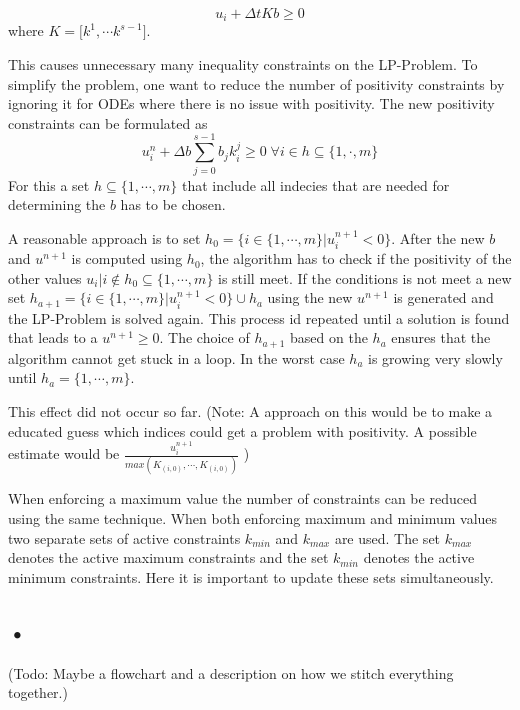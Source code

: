 \documentclass{article}
\begin{document}
\begin{equation}
u_i + \Delta t K  b \geq 0     
\end{equation}
where $K = \big[k^1 , \cdots k^{s-1}\big]$.

This causes unnecessary many inequality constraints on the LP-Problem. To simplify the problem, one want to reduce the number of positivity constraints by ignoring it for ODEs where there is no issue with positivity.
The new positivity constraints can be formulated as
\begin{equation}
u_i^n + \Delta b \sum_{j=0}^{s-1} b_j k_i^j  \geq 0   \;   \forall {i \in h \subseteq \{1,\cdot,m \}} 
\end{equation}
For this a set $h \subseteq \{1,\cdots,m \}$ that include all indecies that are needed for determining the $b$ has to be chosen.

A reasonable approach is to set $h_0 = \{ i \in \{1,\cdots,m \} |  u_i^{n+1}  < 0 \}$. 
After the new $b$ and $u^{n+1}$ is computed using $h_0$, the algorithm has to check if the positivity of the other values $u_i | i \notin h_0 \subseteq \{1,\cdots,m \}$ is still meet. 
If the conditions is not meet a new set $h_{a+1} = \{ i \in \{1,\cdots,m \}|  u_i^{n+1}  < 0 \} \cup h_{a}$ using the new $u^{n+1}$ is generated and the LP-Problem is solved again. This process id repeated until a solution is found that leads to a $u^{n+1} \geq 0$. The choice of $h_{a+1}$ based on the $h_{a}$ ensures that the algorithm cannot get stuck in a loop. In the worst case $h_a$ is growing very slowly until $h_a = \{1,\cdots,m \}$. 

This effect did not occur so far. 
(Note: A approach on this would be to make a educated guess which indices could get a problem with positivity. A possible estimate would be $\frac{u_i^{n+1}}{max(K_{(i,0)}, \cdots ,K_{(i,0)})} $ )

When enforcing a maximum value the number of constraints can be reduced using the same technique. When both enforcing maximum and minimum values two separate sets of active constraints $k_{min}$ and $k_{max}$ are used. The set $k_{max}$ denotes the active maximum constraints and the set $k_{min}$ denotes the active minimum constraints. 
Here it is important to update these sets simultaneously.  

\subsection{•}
(Todo: Maybe a flowchart and a description on how we stitch everything together.) 
\end{document}
